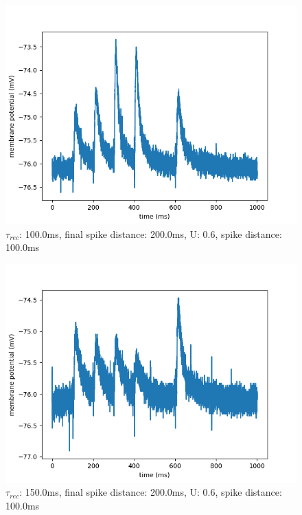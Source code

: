 \documentclass[10pt,a4paper]{scrartcl}
\begin{document}
\begin{figure} [ht]
\begin{center}
\label{fig:abb19}
\caption{$\tau_{rec}$: 100.0ms, final spike distance: 200.0ms, U: 0.6, spike distance: 100.0ms}
\includegraphics[scale=0.35]{pictures/final_spike_variation_9.pdf} 
\end{center}
\end{figure}

\begin{figure} [ht]
\begin{center}
\label{fig:abb20}
\caption{$\tau_{rec}$: 150.0ms, final spike distance: 200.0ms, U: 0.6, spike distance: 100.0ms}
\includegraphics[scale=0.35]{pictures/final_spike_variation_10.pdf} 
\end{center}
\end{figure}
\end{document}
